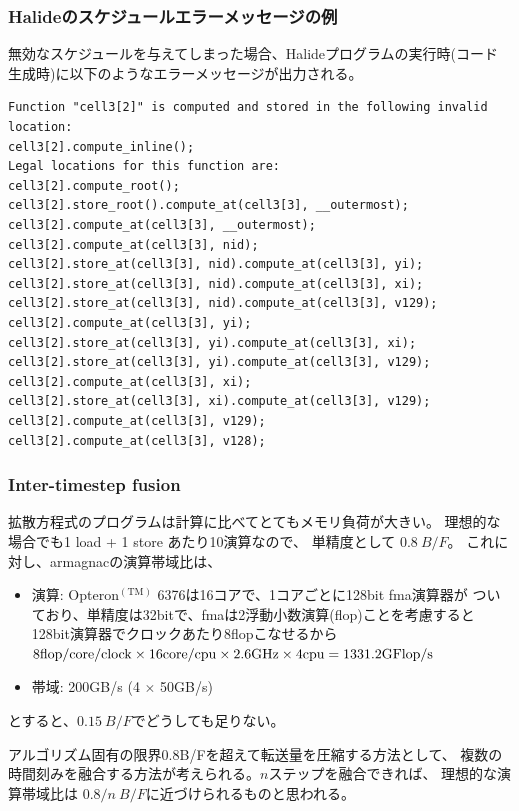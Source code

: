 \documentclass[dvipdfmx,cjk]{beamer}
\begin{document}
\begin{frame}[fragile]\frametitle{Halideのスケジュールエラーメッセージの例}

無効なスケジュールを与えてしまった場合、Halideプログラムの実行時(コード生成時)に以下のようなエラーメッセージが出力される。

\begingroup \fontsize{8pt}{9pt}\selectfont
\begin{verbatim}
Function "cell3[2]" is computed and stored in the following invalid location:
cell3[2].compute_inline();
Legal locations for this function are:
cell3[2].compute_root();
cell3[2].store_root().compute_at(cell3[3], __outermost);
cell3[2].compute_at(cell3[3], __outermost);
cell3[2].compute_at(cell3[3], nid);
cell3[2].store_at(cell3[3], nid).compute_at(cell3[3], yi);
cell3[2].store_at(cell3[3], nid).compute_at(cell3[3], xi);
cell3[2].store_at(cell3[3], nid).compute_at(cell3[3], v129);
cell3[2].compute_at(cell3[3], yi);
cell3[2].store_at(cell3[3], yi).compute_at(cell3[3], xi);
cell3[2].store_at(cell3[3], yi).compute_at(cell3[3], v129);
cell3[2].compute_at(cell3[3], xi);
cell3[2].store_at(cell3[3], xi).compute_at(cell3[3], v129);
cell3[2].compute_at(cell3[3], v129);
cell3[2].compute_at(cell3[3], v128);
\end{verbatim}
\endgroup

\end{frame}


\begin{frame}\frametitle{Inter-timestep fusion}
  拡散方程式のプログラムは計算に比べてとてもメモリ負荷が大きい。
  理想的な場合でも1 load + 1 store あたり10演算なので、
  単精度として $0.8~B/F$。
  これに対し、armagnacの演算帯域比は、
  \begin{itemize}
  \item 演算: Opteron${}^\mathrm{(TM)}$ 6376は16コアで、1コアごとに128bit fma演算器が
    ついており、単精度は32bitで、fmaは2浮動小数演算(flop)ことを考慮すると128bit演算器でクロックあたり8flopこなせるから $\rm 8flop/core/clock \times 16 core/cpu \times 2.6GHz \times 4cpu = 1331.2GFlop/s$
  \item 帯域: 200GB/s (4 $\times$ 50GB/s)
  \end{itemize}
  
  とすると、$0.15~B/F$でどうしても足りない。
  
  アルゴリズム固有の限界0.8B/Fを超えて転送量を圧縮する方法として、
  複数の時間刻みを融合する方法が考えられる。$n$ステップを融合できれば、
  理想的な演算帯域比は
   $0.8/n~B/F$に近づけられるものと思われる。

\end{frame}
\end{document}
